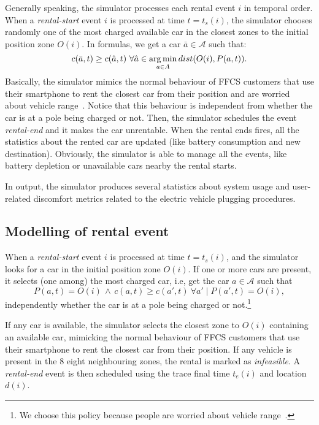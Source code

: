 Generally speaking, the simulator processes each rental event $i$ in temporal order. When a \emph{rental-start} event $i$ is processed at time $t=t_{s}(i)$, the simulator chooses randomly one of the most charged available car in the closest zones to the initial position zone $O(i)$. In formulas, we get a car $\bar{a} \in \mathcal{A}$ such that:
\[
c(\bar{a},t) \geq c(\hat{a},t)\ \forall \hat{a} \in \argmin_{a \in A} {dist(O(i), P(a,t))}.
\]
Basically, the simulator mimics the normal behaviour of FFCS customers that use their smartphone to rent the closest car from their position and are worried about vehicle range~\cite{RangeAnxiety}. Notice that this behaviour is independent from whether the car is at a pole being charged or not.
Then, the simulator schedules the event \emph{rental-end} and it makes the car unrentable. When the rental ends fires, all the statistics about the rented car are updated (like battery consumption and new destination). Obviously, the simulator is able to manage all the events, like battery depletion or unavailable cars nearby the rental starts. 

In output, the simulator produces several statistics about system usage and user-related discomfort metrics related to the electric vehicle plugging procedures. 

\subsection{Modelling of rental event}

When a \emph{rental-start} event $i$ is processed at time $t=t_{s}(i)$, and the simulator looks for a car in the initial position zone $O(i)$. If one or more cars are present, it selects (one among) the most charged car, i.e, get the car $a\in \mathcal{A}$ such that
\[
P(a,t) = O(i) \, \land \, c(a,t) \geq c(a',t)\ \forall a'\mid P(a',t) = O(i),
\]
independently whether the car is at a pole being charged or not.\footnote{We choose this policy because people are worried about vehicle range~\cite{RangeAnxiety}.}

If any car is available, the simulator selects the closest zone to $O(i)$ containing an available car, mimicking the normal behaviour of FFCS customers that use their smartphone to rent the closest car from their position. If any vehicle is present in the 8 eight neighbouring zones, the rental is marked as {\it infeasible}.
A \emph{rental-end} event is then scheduled using the trace final time $t_{e}(i)$ and location $d(i)$.

